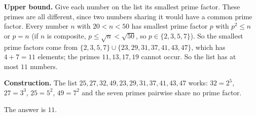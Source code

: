 \textbf{Upper bound.} Give each number on the list its smallest prime factor. These primes are all different, since two numbers sharing it would have a common prime factor. Every number $n$ with $20<n<50$ has smallest prime factor $p$ with $p^2\le n$ or $p=n$ (if $n$ is composite, $p\le\sqrt{n}<\sqrt{50}$, so $p\in\{2,3,5,7\}$). So the smallest prime factors come from $\{2,3,5,7\}\cup\{23,29,31,37,41,43,47\}$, which has $4+7=11$ elements; the primes $11,13,17,19$ cannot occur. So the list has at most $11$ numbers.

\textbf{Construction.} The list $25,27,32,49,23,29,31,37,41,43,47$ works: $32=2^5$, $27=3^3$, $25=5^2$, $49=7^2$ and the seven primes pairwise share no prime factor.

The answer is $\boxed{11}$.

